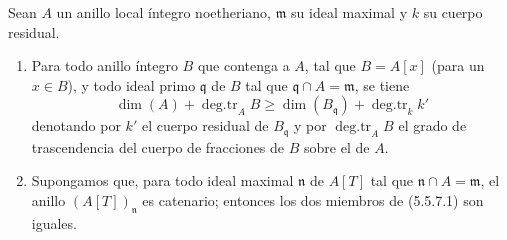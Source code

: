 \begin{lemma}[5.5.7]
\label{IV.2.s5.5.7-fr}
Sean $A$ un anillo local íntegro noetheriano, $\mathfrak m$ su ideal maximal y
$k$ su cuerpo residual.
\begin{enumerate}
\item[\textup{(i)}] Para todo anillo íntegro $B$ que contenga a $A$, tal que $B=A[x]$
(para un $x\in B$), y todo ideal primo $\mathfrak q$ de $B$ tal que
$\mathfrak q\cap A=\mathfrak m$, se tiene
\begin{equation}
\dim(A)+\operatorname{deg.tr}_A B
\geq\dim(B_{\mathfrak q})+\operatorname{deg.tr}_k k'
\tag{5.5.7.1}\label{IV.2.s5.5.7.1-fr}
\end{equation}
denotando por $k'$ el cuerpo residual de $B_{\mathfrak q}$ y por
$\operatorname{deg.tr}_A B$ el grado de trascendencia del cuerpo de
fracciones de $B$ sobre el de $A$.
\item[\textup{(ii)}] Supongamos que, para todo ideal maximal $\mathfrak n$ de $A[T]$
tal que $\mathfrak n\cap A=\mathfrak m$, el anillo $(A[T])_{\mathfrak n}$
es catenario; entonces los dos miembros de \textup{(5.5.7.1)} son iguales.
\end{enumerate}
\end{lemma}

